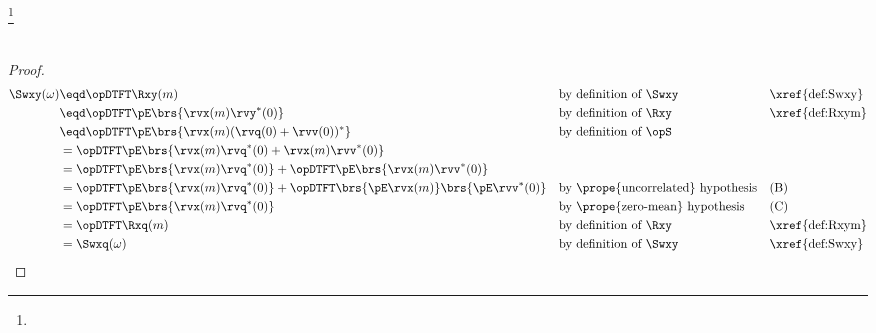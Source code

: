 \begin{proposition}
\footnote{
  }
\label{prop:Swxyv}
\\
\qquad{}
\\
\end{proposition}
\begin{proof}
\begin{align*}
  \Swxy(\omega)
    &\eqd \opDTFT\Rxy(m)
    && \text{by definition of $\Swxy$}
    && \text{\xref{def:Swxy}}
  \\&\eqd \opDTFT\pE\brs{\rvx(m)\rvy^\ast(0)}
    && \text{by definition of $\Rxy$}
    && \text{\xref{def:Rxym}}
  \\&\eqd \opDTFT\pE\brs{\rvx(m)(\rvq(0)+\rvv(0))^\ast}
    && \text{by definition of $\opS$}
  \\&= \opDTFT\pE\brs{\rvx(m)\rvq^\ast(0)+\rvx(m)\rvv^\ast(0)}
  \\&= \opDTFT\pE\brs{\rvx(m)\rvq^\ast(0)} + \opDTFT\pE\brs{\rvx(m)\rvv^\ast(0)}
  \\&= \opDTFT\pE\brs{\rvx(m)\rvq^\ast(0)} + \opDTFT\brs{\pE\rvx(m)}\brs{\pE\rvv^\ast(0)}
    && \text{by \prope{uncorrelated} hypothesis}
    && \text{(B)}
  \\&= \opDTFT\pE\brs{\rvx(m)\rvq^\ast(0)}
    && \text{by \prope{zero-mean} hypothesis}
    && \text{(C)}
  \\&= \opDTFT\Rxq(m)
    && \text{by definition of $\Rxy$}
    && \text{\xref{def:Rxym}}
  \\&= \Swxq(\omega)
    && \text{by definition of $\Swxy$}
    && \text{\xref{def:Swxy}}
\end{align*}
\end{proof}

